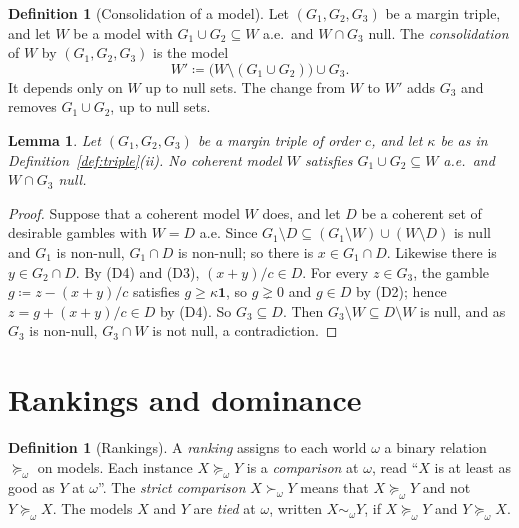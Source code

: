 \documentclass[11pt]{article}
\newcommand{\one}{\mathbf{1}}
\theoremstyle{plain}
\newtheorem{lemma}[theorem]{Lemma}
\theoremstyle{definition}
\newtheorem{definition}[theorem]{Definition}
\begin{document}
\begin{definition}[Consolidation of a model]\label{def:consolidation}
Let $(G_1,G_2,G_3)$ be a margin triple, and let $W$ be a model with $G_1\cup G_2\subseteq W$
a.e.\ and $W\cap G_3$ null. The \emph{consolidation} of $W$ by $(G_1,G_2,G_3)$ is the model
\[
  W'\coloneqq\bigl(W\setminus(G_1\cup G_2)\bigr)\cup G_3 .
\]
It depends only on $W$ up to null sets. The change from $W$ to $W'$ adds $G_3$ and removes
$G_1\cup G_2$, up to null sets.
\end{definition}

\begin{lemma}\label{lem:Wincoherent}
Let $(G_1,G_2,G_3)$ be a margin triple of order $c$, and let $\kappa$ be as in
Definition~\ref{def:triple}(ii). No coherent model $W$ satisfies $G_1\cup G_2\subseteq W$
a.e.\ and $W\cap G_3$ null.
\end{lemma}

\begin{proof}
Suppose that a coherent model $W$ does, and let $D$ be a coherent set of desirable gambles with
$W=D$ a.e. Since $G_1\setminus D\subseteq(G_1\setminus W)\cup(W\setminus D)$ is null and $G_1$
is non-null, $G_1\cap D$ is non-null; so there is $x\in G_1\cap D$. Likewise there is $y\in
G_2\cap D$. By (D4) and (D3), $(x+y)/c\in D$. For every $z\in G_3$, the gamble $g\coloneqq
z-(x+y)/c$ satisfies $g\ge\kappa\one$, so $g\gneq0$ and $g\in D$ by (D2); hence $z=g+(x+y)/c\in
D$ by (D4). So $G_3\subseteq D$. Then $G_3\setminus W\subseteq D\setminus W$ is null, and as
$G_3$ is non-null, $G_3\cap W$ is not null, a contradiction.
\end{proof}

\section{Rankings and dominance}\label{sec:rankings}

\begin{definition}[Rankings]\label{def:ranking}
A \emph{ranking} assigns to each world $\omega$ a binary relation $\succeq_\omega$ on models.
Each instance $X\succeq_\omega Y$ is a \emph{comparison} at $\omega$, read ``$X$ is at least as
good as $Y$ at $\omega$''. The \emph{strict comparison} $X\succ_\omega Y$ means that
$X\succeq_\omega Y$ and not $Y\succeq_\omega X$. The models $X$ and $Y$ are \emph{tied} at
$\omega$, written $X\sim_\omega Y$, if $X\succeq_\omega Y$ and $Y\succeq_\omega X$.
\end{definition}
\end{document}
